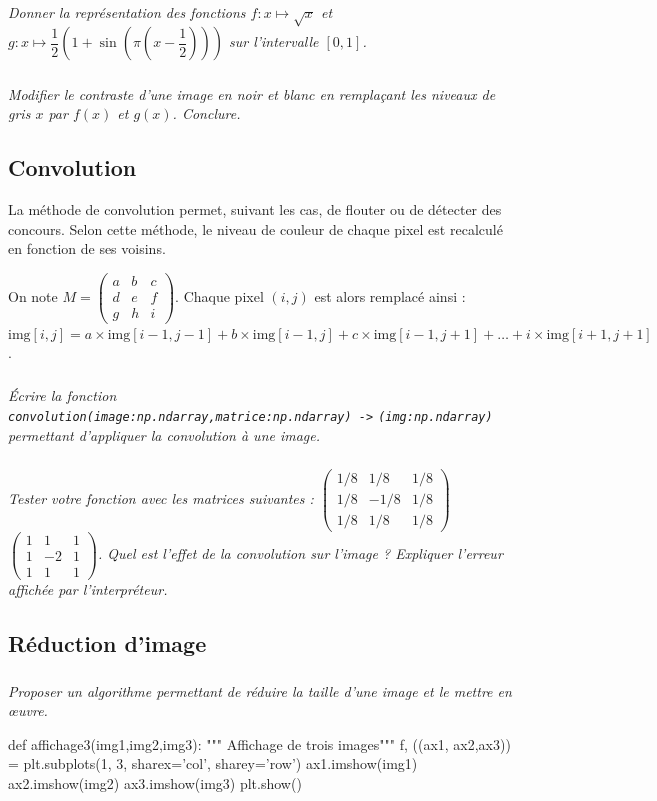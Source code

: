 \documentclass[10pt,fleqn]{article} %
\begin{document}
\begin{multicols}{2}
\subparagraph{}\textit{Donner la représentation des fonctions $f:x \mapsto \sqrt{x}$ et $g:x\mapsto \dfrac{1}{2}\left(1+\sin\left(\pi\left(x-\dfrac{1}{2}\right)\right)\right)$ sur l'intervalle $[0,1]$.}

\subparagraph{}\textit{Modifier le contraste d'une image en noir et blanc en remplaçant les niveaux de gris $x$ par $f(x)$ et $g(x)$. Conclure.}

\subsection*{Convolution}
La méthode de convolution permet, suivant les cas, de flouter ou de détecter des concours. 
Selon cette méthode, le niveau de couleur de chaque pixel est recalculé en fonction de ses voisins. 


On note $M=\begin{pmatrix} a & b & c \\ d & e & f \\ g & h & i \end{pmatrix}$. Chaque pixel $(i,j)$ est alors remplacé ainsi : $\text{img}[i, j] = a \times \text{img}[i-1, j-1] + b \times \text{img}[i-1, j]+ c \times \text{img}[i-1, j+1] + \ldots + i \times \text{img}[i+1, j+1]$.

\subparagraph{}\textit{Écrire la fonction \\ \texttt{convolution(image:np.ndarray,matrice:np.ndarray) ->} \texttt{(img:np.ndarray)} permettant d'appliquer la convolution à une image.}


\subparagraph{}\textit{Tester votre fonction avec les matrices suivantes : 
$\begin{pmatrix} 1/8 & 1/8 & 1/8 \\ 1/8 & -1/8 & 1/8 \\ 1/8 & 1/8 & 1/8 \end{pmatrix}$ 
$\begin{pmatrix} 1 & 1 & 1 \\ 1 & -2 & 1 \\ 1 & 1 & 1 \end{pmatrix}$. Quel est l'effet de la convolution sur l'image ? Expliquer l'erreur affichée par l'interpréteur.}


\subsection*{Réduction d'image}
\subparagraph{}\textit{Proposer un algorithme permettant de réduire la taille d'une image et le mettre en \oe{}uvre.}
\ifprof
\else
\end{multicols}
\fi


\begin{py}
\begin{python}
def affichage3(img1,img2,img3):
    """ Affichage de trois images"""
    f, ((ax1, ax2,ax3)) = plt.subplots(1, 3, sharex='col', sharey='row')
    ax1.imshow(img1)
    ax2.imshow(img2)    
    ax3.imshow(img3)
    plt.show()
\end{python}
\end{py}
\end{document}
